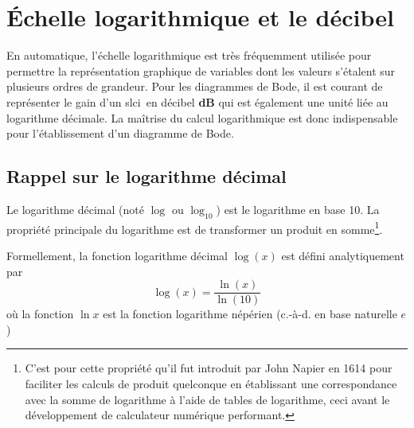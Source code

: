 \chapter{\'Echelle logarithmique et le décibel~\label{annexe-log}}
En automatique, l'échelle logarithmique est très fréquemment 
utilisée pour permettre la représentation
graphique de variables dont les valeurs s'étalent sur plusieurs ordres 
de grandeur. Pour les diagrammes de Bode, il est courant de représenter le gain 
d'un \gls{slci}~en décibel \textbf{dB} qui est également une unité liée au 
logarithme décimale. La maîtrise du calcul logarithmique est donc indispensable
pour l'établissement d'un diagramme de Bode.
\section{Rappel sur le logarithme décimal}
Le logarithme décimal (noté $\log$ ou $\log_{10}$) est le logarithme en base 10.
La propriété principale du logarithme est de transformer un produit en 
somme\footnote{C'est pour cette propriété qu'il fut introduit par John Napier 
en 1614 pour faciliter les calculs de produit quelconque en établissant une 
correspondance avec la somme de logarithme à l'aide de tables de logarithme, 
ceci avant le développement de calculateur numérique performant.}.

Formellement, la fonction logarithme décimal $\log{(x)}$ est défini 
analytiquement par 
\[
\log{(x)}=\dfrac{\ln{(x)}}{\ln{(10)}}
\]
où la fonction $\ln{x}$ est la fonction logarithme népérien (c.-à-d. en base 
naturelle $e$) 
